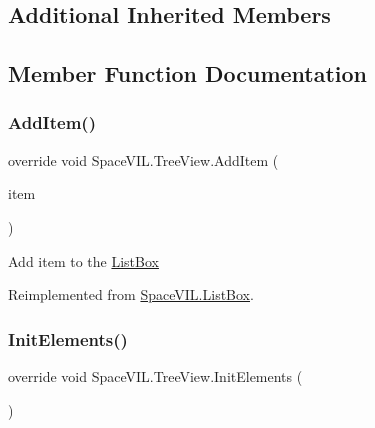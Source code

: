 \subsection*{Additional Inherited Members}


\subsection{Member Function Documentation}
\mbox{\label{class_space_v_i_l_1_1_tree_view_ab810906945c91dc1db571b446ea2f6a0}} 
\subsubsection{\texorpdfstring{Add\+Item()}{AddItem()}}
{\footnotesize\ttfamily override void Space\+V\+I\+L.\+Tree\+View.\+Add\+Item (\begin{DoxyParamCaption}\item[{\mbox{\hyperlink{interface_space_v_i_l_1_1_core_1_1_i_base_item}{I\+Base\+Item}}}]{item }\end{DoxyParamCaption})\hspace{0.3cm}{\ttfamily [virtual]}}



Add item to the \mbox{\hyperlink{class_space_v_i_l_1_1_list_box}{List\+Box}} 



Reimplemented from \mbox{\hyperlink{class_space_v_i_l_1_1_list_box_a3650d9e40035bd0d22c30b475a0a90f0}{Space\+V\+I\+L.\+List\+Box}}.

\mbox{\label{class_space_v_i_l_1_1_tree_view_ac44a1df7d58a35e35842170162645e08}} 
\subsubsection{\texorpdfstring{Init\+Elements()}{InitElements()}}
{\footnotesize\ttfamily override void Space\+V\+I\+L.\+Tree\+View.\+Init\+Elements (\begin{DoxyParamCaption}{ }\end{DoxyParamCaption})\hspace{0.3cm}{\ttfamily [virtual]}}




